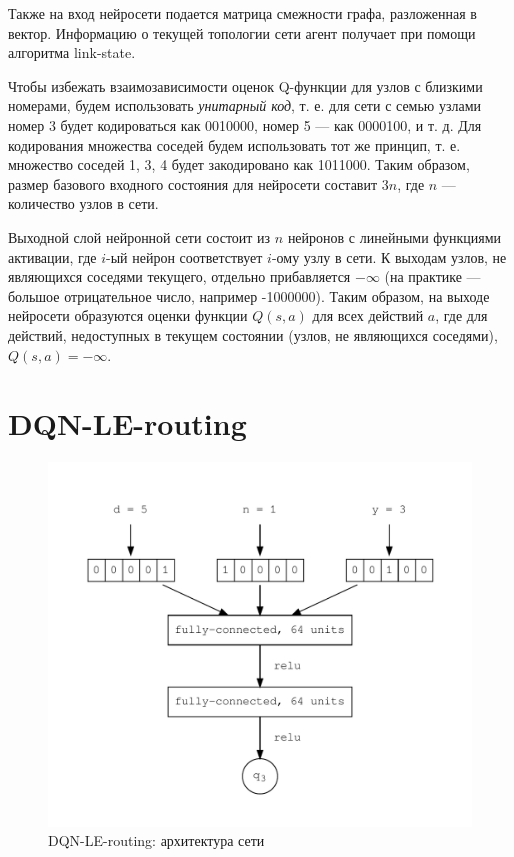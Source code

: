 \documentclass[specification,annotation,times]{itmo-student-thesis}
\theoremstyle{definition}
\begin{document}
Также на вход нейросети подается матрица смежности графа, разложенная в вектор.
Информацию о текущей топологии сети агент получает при помощи алгоритма link-state.

Чтобы избежать взаимозависимости оценок Q-функции для узлов с близкими номерами, будем
использовать \textit{унитарный код}, т. е. для сети с семью узлами номер 3 будет
кодироваться как 0010000, номер 5 --- как 0000100, и т. д. Для кодирования
множества соседей будем использовать тот же принцип, т. е. множество соседей 1,
3, 4 будет закодировано как 1011000. Таким образом, размер базового входного
состояния для нейросети составит $3n$, где $n$ --- количество узлов в сети.

Выходной слой нейронной сети состоит из $n$
нейронов с линейными функциями активации, где $i$-ый нейрон
соответствует $i$-ому узлу в сети. К выходам узлов, не являющихся соседями
текущего, отдельно прибавляется $-\infty$ (на практике --- большое отрицательное
число, например -1000000). Таким образом, на выходе нейросети образуются оценки
функции $Q(s, a)$ для всех действий $a$, где для действий, недоступных в текущем
состоянии (узлов, не являющихся соседями), $Q(s, a) = -\infty$.

\section{DQN-LE-routing}

\begin{figure}[!h]
  \caption{DQN-LE-routing: архитектура сети}\label{nn-1-one-out}
  \centering
  \includegraphics[scale=0.5]{nn-1-one-out}
\end{figure}
\end{document}
